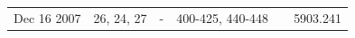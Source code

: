 \documentclass[a4paper,12pt]{article}
\begin{document}
\begin{table}
\begin{tabular}{rrrrrr}
                                                                                                                                                                                                                                                                                                                                                                                                                                                                                                                                                     Dec 16 2007 & 26, 24, 27 & -     & 400-425, 440-448 &       & 5903.241 \\
                                                                                                                                                                                                                                                                                                                                                                                                                                                                                                                                                                                                                                                                                                                                                                                                                                                                                                                                                                                                                                                                                                                                                                                                                                                                                                                                                                                                                                                                                                                                                                                                                                                                                                                                                                                                                                                                                                                                                                                                                                                                                                                                                                                                                                                                                                                                                                                                                                                                                                                                                                                                                                                                                                                     
\end{tabular}
\end{table}
\end{document}
